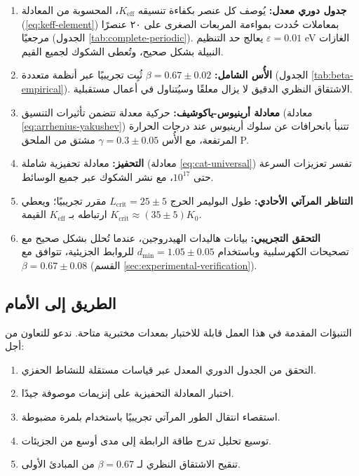 \documentclass[12pt,a4paper]{article}
\theoremstyle{remark}
\newcommand{\Keff}{K_{\mathrm{eff}}}
\newcommand{\Kcrit}{K_{\mathrm{crit}}}
\begin{document}
	\begin{enumerate}
		\item \textbf{جدول دوري معدل:} يُوصف كل عنصر بكفاءة تنسيقه $\Keff$، المحسوبة من المعادلة (\ref{eq:keff-element}) بمعاملات حُددت بمواءمة المربعات الصغرى على ٢٠ عنصرًا مرجعيًا (الجدول \ref{tab:complete-periodic}). يعالج حد التنظيم $\varepsilon = 0.01$ eV الغازات النبيلة بشكل صحيح، وتُعطى الشكوك لجميع القيم.
		
		\item \textbf{الأُس الشامل:} $\beta = 0.67 \pm 0.02$ ثُبِت تجريبيًا عبر أنظمة متعددة (الجدول \ref{tab:beta-empirical}). الاشتقاق النظري الدقيق لا يزال معلقًا وسيُتناول في أعمال مستقبلية.
		
		\item \textbf{معادلة أرينيوس-ياكوشيف:} حركية معدلة تتضمن تأثيرات التنسيق (معادلة \ref{eq:arrhenius-yakushev}) تتنبأ بانحرافات عن سلوك أرينيوس عند درجات الحرارة المرتفعة، مع الأُس $\gamma = 0.3 \pm 0.05$ مشتق من الملحق P.
		
		\item \textbf{التحفيز:} معادلة تحفيزية شاملة (معادلة \ref{eq:cat-universal}) تفسر تعزيزات السرعة حتى $10^{17}$، مع نشر الشكوك عبر جميع الوسائط.
		
		\item \textbf{التناظر المرآتي الأحادي:} طول البوليمر الحرج $L_{\text{crit}} = 25 \pm 5$ مقرر تجريبيًا؛ ويعطي ارتباطه بـ $\Keff$ القيمة $\Kcrit \approx (35 \pm 5) K_0$.
		
		\item \textbf{التحقق التجريبي:} بيانات هاليدات الهيدروجين، عندما تُحلل بشكل صحيح مع تصحيحات الكهرسلبية وباستخدام $d_{\text{min}} = 1.05 \pm 0.05$ للروابط الجزيئية، تتوافق مع $\beta = 0.67 \pm 0.08$ (القسم \ref{sec:experimental-verification}).
	\end{enumerate}
	
	\subsection{الطريق إلى الأمام}
	
	التنبؤات المقدمة في هذا العمل قابلة للاختبار بمعدات مختبرية متاحة. ندعو للتعاون من أجل:
	\begin{enumerate}
		\item التحقق من الجدول الدوري المعدل عبر قياسات مستقلة للنشاط الحفزي.
		\item اختبار المعادلة التحفيزية على إنزيمات موصوفة جيدًا.
		\item استقصاء انتقال الطور المرآتي تجريبيًا باستخدام بلمرة مضبوطة.
		\item توسيع تحليل تدرج طاقة الرابطة إلى مدى أوسع من الجزيئات.
		\item تنقيح الاشتقاق النظري لـ $\beta = 0.67$ من المبادئ الأولى.
	\end{enumerate}
	
\end{document}
